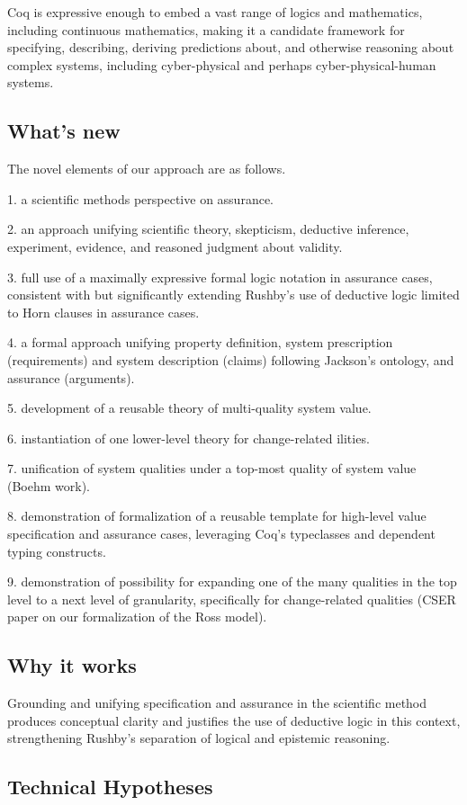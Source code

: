 \documentclass{article} %
\begin{document}
Coq is expressive enough to embed a vast range of logics and mathematics, including continuous mathematics, making it a candidate framework for specifying, describing, deriving predictions about, and otherwise reasoning about complex systems, including cyber-physical and perhaps cyber-physical-human systems.
\subsection{What's new}
The novel elements of our approach are as follows.

1. a scientific methods perspective on assurance.

2. an approach unifying scientific theory, skepticism, deductive inference, experiment, evidence, and reasoned judgment about validity.

3. full use of a maximally expressive formal logic notation in assurance cases, consistent with but significantly extending Rushby's use of deductive logic limited to Horn clauses in assurance cases.

4. a formal approach unifying property definition, system prescription (requirements)  and system description (claims) following Jackson's ontology, and assurance (arguments).

5. development of a reusable theory of multi-quality system value.

6. instantiation of one lower-level theory for change-related ilities.

7. unification of system qualities under a top-most quality of system value (Boehm work).

8. demonstration of formalization of a reusable template for high-level value specification and assurance cases, leveraging Coq's typeclasses and dependent typing constructs.

9. demonstration of possibility for expanding one of the many qualities in the top level to a next level of granularity, specifically for change-related qualities (CSER paper on our formalization of the Ross model).

\subsection{Why it works}

Grounding and unifying specification and assurance in the scientific method produces conceptual clarity and justifies the use of deductive logic in this context, strengthening Rushby's separation of logical and epistemic reasoning.
\subsection{Technical Hypotheses}
\end{document}
